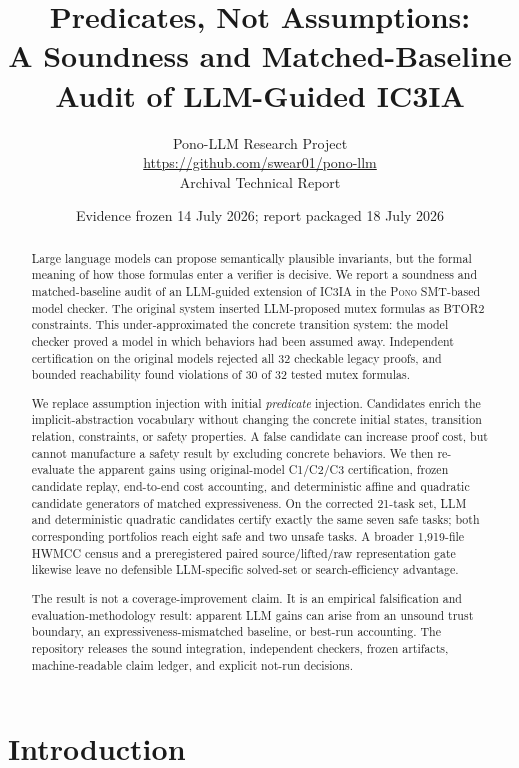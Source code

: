 \documentclass[10pt]{article}
\title{\textbf{Predicates, Not Assumptions:}\\
  A Soundness and Matched-Baseline Audit of LLM-Guided IC3IA}
\author{Pono-LLM Research Project\\
  \url{https://github.com/swear01/pono-llm}\\
  \small Archival Technical Report}
\date{Evidence frozen 14 July 2026; report packaged 18 July 2026}
\newcommand{\pono}{\textsc{Pono}}
\newcommand{\icthreeia}{\textsc{IC3IA}}
\newcommand{\btor}{\textsc{BTOR2}}
\begin{document}
\maketitle

\begin{abstract}
Large language models can propose semantically plausible invariants, but the
formal meaning of how those formulas enter a verifier is decisive.  We report a
soundness and matched-baseline audit of an LLM-guided extension of
\icthreeia{} in the \pono{} SMT-based model checker.  The original system
inserted LLM-proposed mutex formulas as \btor{} constraints.  This
under-approximated the concrete transition system: the model checker proved a
model in which behaviors had been assumed away.  Independent certification on
the original models rejected all 32 checkable legacy proofs, and bounded
reachability found violations of 30 of 32 tested mutex formulas.

We replace assumption injection with initial \emph{predicate} injection.
Candidates enrich the implicit-abstraction vocabulary without changing the
concrete initial states, transition relation, constraints, or safety
properties.  A false candidate can increase proof cost, but cannot manufacture
a safety result by excluding concrete behaviors.  We then re-evaluate the
apparent gains using original-model C1/C2/C3 certification, frozen candidate
replay, end-to-end cost accounting, and deterministic affine and quadratic
candidate generators of matched expressiveness.  On the corrected 21-task
set, LLM and deterministic quadratic candidates certify exactly the same seven
safe tasks; both corresponding portfolios reach eight safe and two unsafe
tasks.  A broader 1,919-file HWMCC census and a preregistered paired
source/lifted/raw representation gate likewise leave no defensible
LLM-specific solved-set or search-efficiency advantage.

The result is not a coverage-improvement claim.  It is an empirical
falsification and evaluation-methodology result: apparent LLM gains can arise
from an unsound trust boundary, an expressiveness-mismatched baseline, or
best-run accounting.  The repository releases the sound integration,
independent checkers, frozen artifacts, machine-readable claim ledger, and
explicit not-run decisions.
\end{abstract}

\section{Introduction}
\end{document}
